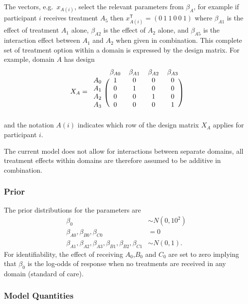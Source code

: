 \documentclass[
]{article}
\begin{document}
The vectors, e.g.~\(x_{A(i)}\), select the relevant parameters from \(\beta_A\), for example if participant \(i\) receives treatment \(A_5\) then \(x_{A(i)}^{\mathsf{T}} = (0\ 1\ 1\ 0\ 0\ 1)\) where \(\beta_{A1}\) is the effect of treatment \(A_1\) alone, \(\beta_{A2}\) is the effect of \(A_2\) alone, and \(\beta_{A5}\) is the interaction effect between \(A_1\) and \(A_2\) when given in combination.
This complete set of treatment option within a domain is expressed by the design matrix.
For example, domain \(A\) has design
\[
 X_{A} = 
\begin{blockarray}{ccccccc}
          & \beta_{A0} & \beta_{A1} & \beta_{A2} & \beta_{A3} \\
\begin{block}{r(cccccc)}
      A_0 & 1 & 0 & 0 & 0 \\
      A_1 & 0 & 1 & 0 & 0 \\
      A_2 & 0 & 0 & 1 & 0 \\
      A_3 & 0 & 0 & 0 & 1 \\
\end{block}
\end{blockarray}
\]
and the notation \(A(i)\) indicates which row of the design matrix \(X_A\) applies for participant \(i\).

The current model does not allow for interactions between separate domains, all treatment effects within domains are therefore assumed to be additive in combination.

\hypertarget{prior}{%
\subsubsection{Prior}\label{prior}}

The prior distributions for the parameters are
\[
\begin{aligned}
\beta_0 &\sim N(0, 10^2) \\
\beta_{A0},\beta_{B0},\beta_{C0} &= 0 \\
\beta_{A1},\beta_{A2},\beta_{A3},\beta_{B1},\beta_{B2},\beta_{C1} &\sim N(0, 1).
\end{aligned}
\]
For identifiability, the effect of receiving \(A_0\),\(B_0\) and \(C_0\) are set to zero implying that \(\beta_0\) is the log-odds of response when no treatments are received in any domain (standard of care).

\hypertarget{model-quantities}{%
\subsubsection{Model Quantities}\label{model-quantities}}
\end{document}
